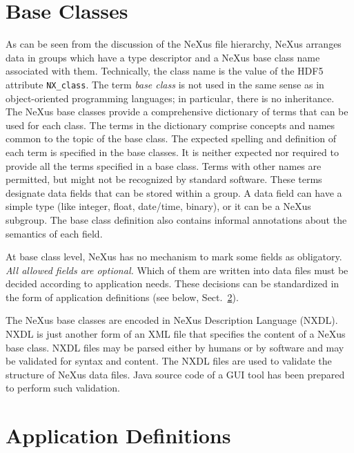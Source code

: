 \documentclass[%
 aip,
rsi,
 amsmath,amssymb,
 reprint,%
]{revtex4-1}
\begin{document}
\section{Base Classes}

As can be seen from the discussion of the NeXus file hierarchy, 
NeXus arranges data in groups which have a 
type descriptor and a NeXus base class name associated with them.
Technically, the class name is the value of the HDF5 attribute \texttt{NX\_class}.
The term \emph{base class} is not used in the same sense as in  
object-oriented programming languages; in particular, there is no inheritance.
The NeXus base classes provide a comprehensive dictionary of terms 
that can be used for each class. 
The terms in the dictionary comprise concepts and names common to the topic of the base class.
The expected spelling and definition of each term is specified in the base classes. 
It is neither expected nor required to provide all the terms specified in a base class. 
Terms with other names are permitted, but might not be recognized by standard software.
These terms designate data fields that can be stored within a group.
A data field can have a simple type (like integer, float, date/time, binary),
or it can be a NeXus subgroup.
The base class definition also contains informal annotations
about the semantics of each field.

At base class level, NeXus has no mechanism to mark some fields as obligatory.
\emph{All allowed fields are optional.}
Which of them are written into data files must be decided
according to application needs.
These decisions can be standardized in the form of
application definitions (see below, Sect.~\ref{sect_appdef}).

The NeXus base classes are encoded in NeXus Description Language (NXDL)\cite{nxman}. NXDL is 
just another form of an XML file that specifies the content of a NeXus base class. 
NXDL files may be parsed either by humans or by software and 
may be validated for syntax and content.  The NXDL files are used to validate the structure of
NeXus data files. Java source code of a GUI tool has been prepared\cite{nxvalidate} to perform such validation.%


\section{Application Definitions}
  \label{sect_appdef}
\end{document}
